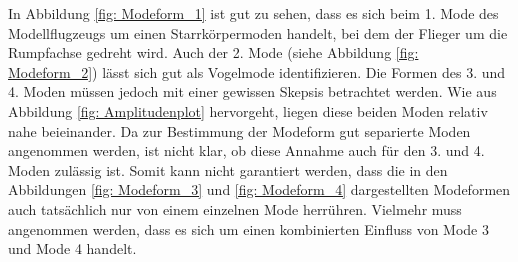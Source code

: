     \noindent
    In Abbildung \ref{fig: Modeform_1} ist gut zu sehen, dass es sich beim 1.
    Mode des Modellflugzeugs um einen Starrkörpermoden handelt, bei dem der
    Flieger um die Rumpfachse gedreht wird. Auch der 2. Mode
    (siehe Abbildung \ref{fig: Modeform_2}) lässt sich gut als
    \glqq Vogelmode\grqq \hspace{0.05cm} identifizieren. Die Formen des 3. und 4.
    Moden müssen jedoch mit einer gewissen Skepsis betrachtet werden. Wie aus
    Abbildung \ref{fig: Amplitudenplot} hervorgeht, liegen diese beiden Moden
    relativ nahe beieinander. Da zur Bestimmung der Modeform gut separierte
    Moden angenommen werden, ist nicht klar, ob diese Annahme auch für den 3.
    und 4. Moden zulässig ist. Somit kann nicht garantiert werden, dass die in
    den Abbildungen \ref{fig: Modeform_3} und \ref{fig: Modeform_4}
    dargestellten Modeformen auch tatsächlich nur von einem einzelnen Mode
    herrühren. Vielmehr muss angenommen werden, dass es sich um einen
    kombinierten Einfluss von Mode 3 und Mode 4 handelt.